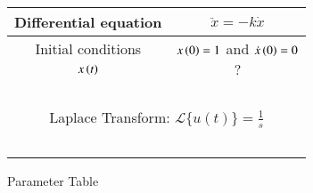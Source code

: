 \centering
\begin{tabular}{ | c | c|  } 
  \hline
   Differential equation & $\ddot{x} = -k\dot{x}$ \\ 
  \hline
  Initial conditions & $x\left(0\right)=1$ and $\dot{x}\left(0\right)=0$ \\
  \hline
  $x\left(t\right)$ & $?$ \\ 
  \hline
  \multicolumn{2}{|c|}{~}\\
 \multicolumn{2}{|c|}{Laplace Transform: $\mathcal{L}\{u(t)\} = \frac{1}{s}$} \\ 
 \multicolumn{2}{|c|}{~}\\
  \hline
\end{tabular}
\caption{Parameter Table}
\label{tab:gate2023.in.20.1}
